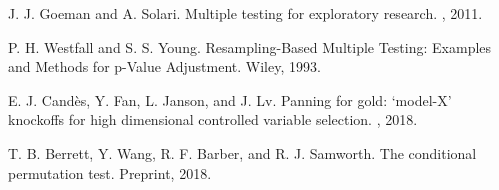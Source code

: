 \documentclass[11pt]{article}
\begin{document}
\begin{footnotesize}
\begin{thebibliography}{}
J. J. Goeman and A. Solari. 
\newblock Multiple testing for exploratory research.
, 2011.


P. H. Westfall and S. S. Young.
\newblock Resampling-Based Multiple Testing: Examples and Methods for p-Value Adjustment.
\newblock Wiley, 1993.

E. J. Cand\`{e}s, Y. Fan, L. Janson, and J. Lv.
\newblock Panning for gold: `model-X' knockoffs for high dimensional controlled variable selection.
, 2018.

T. B. Berrett, Y. Wang, R. F. Barber, and R. J. Samworth.
\newblock The conditional permutation test.
\newblock Preprint, 2018.



\end{thebibliography}
\end{footnotesize}
\end{document}
